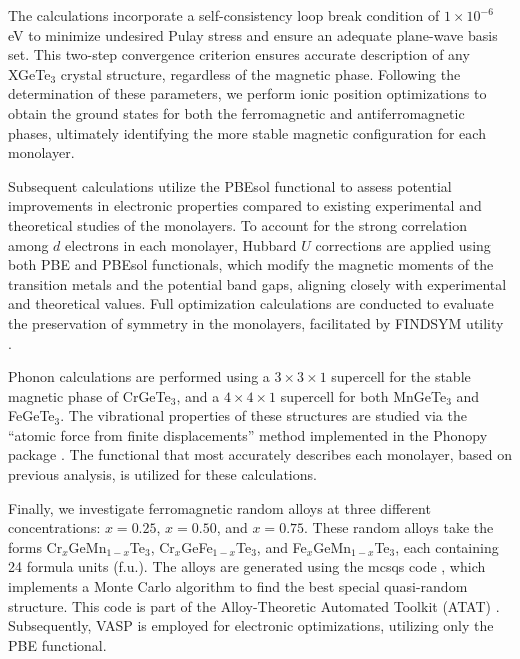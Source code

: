 The calculations incorporate a self-consistency loop break condition of \(1 \times 10^{-6}\) eV to minimize undesired Pulay stress and ensure an adequate plane-wave basis set. This two-step convergence criterion ensures accurate description of any XGeTe$_{3}$ crystal structure, regardless of the magnetic phase. Following the determination of these parameters, we perform ionic position optimizations to obtain the ground states for both the ferromagnetic and antiferromagnetic phases, ultimately identifying the more stable magnetic configuration for each monolayer.  

Subsequent calculations utilize the PBEsol functional to assess potential improvements in electronic properties compared to existing experimental and theoretical studies of the monolayers. To account for the strong correlation among \(d\) electrons in each monolayer, Hubbard \(U\) corrections are applied using both PBE and PBEsol functionals, which modify the magnetic moments of the transition metals and the potential band gaps, aligning closely with experimental and theoretical values. Full optimization calculations are conducted to evaluate the preservation of symmetry in the monolayers, facilitated by FINDSYM utility \supercite{stokes2005findsym}.  

Phonon calculations are performed using a \(3 \times 3 \times 1\) supercell for the stable magnetic phase of CrGeTe$_{3}$, and a \(4 \times 4 \times 1\) supercell for both MnGeTe$_{3}$ and FeGeTe$_{3}$. The vibrational properties of these structures are studied via the “atomic force from finite displacements” method implemented in the Phonopy package \supercite{phonopy-phono3py-JPCM,phonopy-phono3py-JPSJ}. The functional that most accurately describes each monolayer, based on previous analysis, is utilized for these calculations.  

Finally, we investigate ferromagnetic random alloys at three different concentrations: \(x = 0.25\), \(x = 0.50\), and \(x = 0.75\). These random alloys take the forms Cr\(_{x}\)GeMn\(_{1-x}\)Te\(_{3}\), Cr\(_{x}\)GeFe\(_{1-x}\)Te\(_{3}\), and Fe\(_{x}\)GeMn\(_{1-x}\)Te\(_{3}\), each containing 24 formula units (f.u.). The alloys are generated using the mcsqs code \supercite{atat5}, which implements a Monte Carlo algorithm to find the best special quasi-random structure. This code is part of the Alloy-Theoretic Automated Toolkit (ATAT) \supercite{atat1,atat2,atat3,atat4,atat5,atat6,atat7,atat8,atat9,atat10,atat11,atat12,atat13,atat14,atat15,atat16}. Subsequently, VASP is employed for electronic optimizations, utilizing only the PBE functional. 
